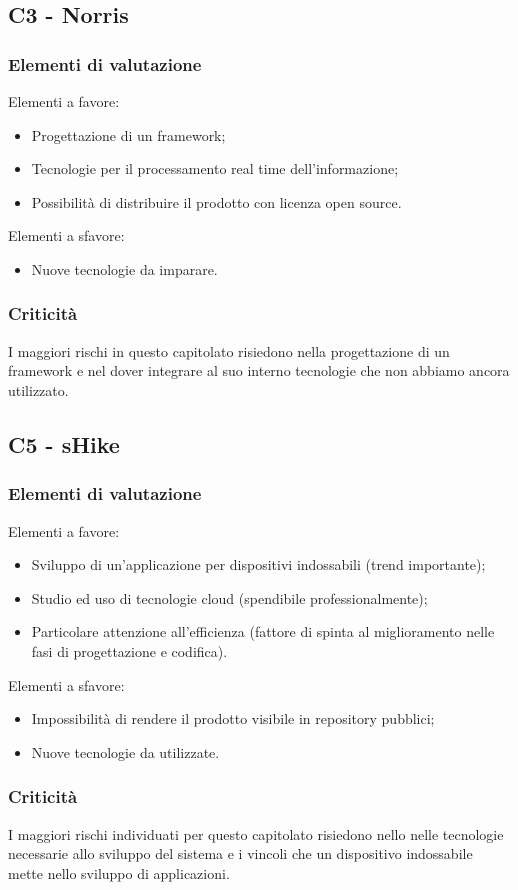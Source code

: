 \subsection{C3 - Norris}{
	\subsubsection{Elementi di valutazione}{
		Elementi a favore:
		\begin{itemize}
			\item Progettazione di un framework;
			\item Tecnologie per il processamento real time dell'informazione;
			\item Possibilità di distribuire il prodotto con licenza open source.
		\end{itemize}
		
		Elementi a sfavore:
		\begin{itemize}
			\item Nuove tecnologie da imparare.
		\end{itemize}
	}
	\subsubsection{Criticità}{
		I maggiori rischi in questo capitolato risiedono nella progettazione di un framework e nel dover integrare al suo interno tecnologie che non abbiamo ancora utilizzato.
	}
}

\subsection{C5 - sHike}{
	\subsubsection{Elementi di valutazione}{
		Elementi a favore:
		\begin{itemize}
			\item Sviluppo di un'applicazione per dispositivi indossabili (trend importante);
			\item Studio ed uso di tecnologie cloud (spendibile professionalmente);
			\item Particolare attenzione all'efficienza (fattore di spinta al miglioramento nelle fasi di progettazione e codifica).
		\end{itemize}
		
		Elementi a sfavore:
		\begin{itemize}
			\item Impossibilità di rendere il prodotto visibile in repository pubblici;
			\item Nuove tecnologie da utilizzate.
		\end{itemize}
	}
	\subsubsection{Criticità}{
		I maggiori rischi individuati per questo capitolato risiedono nello nelle tecnologie necessarie allo sviluppo del sistema e i vincoli che un dispositivo indossabile mette nello sviluppo di applicazioni. 
	}
}